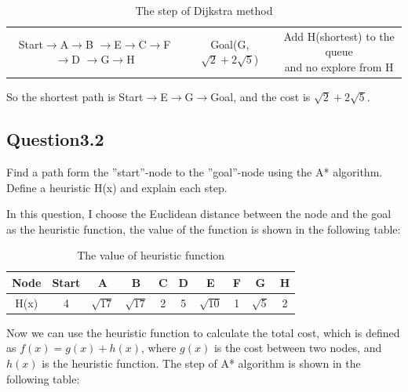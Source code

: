 \documentclass{article}
\begin{document}
\begin{table}[H]
\begin{tabular}{c|c|c}
                \hline
                \makecell*[c]{Start$\rightarrow$A$\rightarrow$B\\$\rightarrow$E$\rightarrow$C$\rightarrow$F$\rightarrow$D\\$\rightarrow$G$\rightarrow$H} & \textcolor[rgb]{1,0,0}{Goal(G,$\sqrt{2}+2\sqrt{5}$)} & \makecell*[c]{Add H(shortest) to the queue\\ and no explore from H}\\
            \end{tabular}
            \caption{The step of Dijkstra method}
            \label{tab:my_label}
        \end{table}

        So the shortest path is Start$\rightarrow$E$\rightarrow$G$\rightarrow$Goal, and the cost is $\sqrt{2}+2\sqrt{5}$.
        \subsection{Question3.2}
        Find a path form the ”start”-node to the ”goal”-node using the A* algorithm. Define a heuristic H(x) and explain each step.

        \noindent
        In this question, I choose the Euclidean distance between the node and the goal as the heuristic function, the value of the function is shown in the following table:
        \begin{table}[H]
            \centering
            \begin{tabular}{c|c|c|c|c|c|c|c|c|c}
                Node & Start & A & B & C & D & E & F & G & H \\
                \hline
                H(x) & 4 & $\sqrt{17}$ & $\sqrt{17}$ & 2 & 5 & $\sqrt{10}$ & 1 & $\sqrt{5}$ & 2
            \end{tabular}
            \caption{The value of heuristic function}
            \label{tab:my_label}
        \end{table}
        Now we can use the heuristic function to calculate the total cost, which is defined as $f(x)=g(x)+h(x)$, where $g(x)$ is the cost between two nodes, and $h(x)$ is the heuristic function. The step of A* algorithm is shown in the following table:
\end{document}
